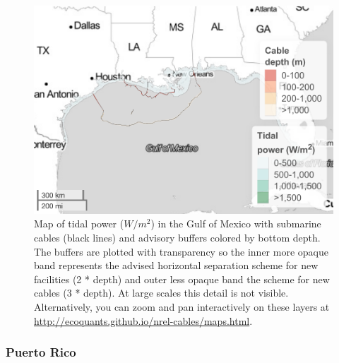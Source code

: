 \documentclass[]{article}
\begin{document}
\begin{figure}
\centering
\includegraphics{report_files/figure-latex/mapTideGulfofMexico-1.pdf}
\caption{\label{fig:mapTideGulfofMexico}Map of tidal power (\(W/m^2\)) in
the Gulf of Mexico with submarine cables (black lines) and advisory
buffers colored by bottom depth. The buffers are plotted with
transparency so the inner more opaque band represents the advised
horizontal separation scheme for new facilities (2 * depth) and outer
less opaque band the scheme for new cables (3 * depth). At large scales
this detail is not visible. Alternatively, you can zoom and pan
interactively on these layers at
\url{http://ecoquants.github.io/nrel-cables/maps.html}.}
\end{figure}

\hypertarget{puerto-rico}{%
\subsubsection{Puerto Rico}\label{puerto-rico}}
\end{document}
